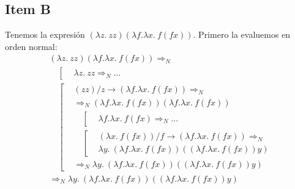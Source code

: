 \documentclass{article}
\begin{document}
\subsection*{Item B}
Tenemos la expresión $(\lambda z.\ zz)(\lambda f.\lambda x.\ f(fx))$.
Primero la evaluemos en orden normal:
\begin{equation*}
  \begin{aligned}
    &(\lambda z.\ zz)(\lambda f.\lambda x.\ f(fx)) \Rightarrow_N \\
    &\quad\left[
      \begin{aligned}
        &\lambda z.\ zz \Rightarrow_N \dots
      \end{aligned}
    \right. \\ 
    &\quad\left[
      \begin{aligned}
        &(zz) / z \to (\lambda f.\lambda x.\ f(fx)) \Rightarrow_N \\ 
        &\Rightarrow_N (\lambda f.\lambda x.\ f(fx))(\lambda f.\lambda x.\ f(fx)) \\
        &\quad\left[
          \begin{aligned}
            &\lambda f.\lambda x.\ f(fx) \Rightarrow_N \dots
          \end{aligned}
        \right. \\ 
        &\quad\left[
          \begin{aligned}
            &(\lambda x.\ f(fx)) / f \to (\lambda f.\lambda x.\ f(fx)) \Rightarrow_N \\ 
            &\lambda y.\ (\lambda f.\lambda x.\ f(fx))((\lambda f.\lambda x.\ f(fx))y)
          \end{aligned}
        \right. \\ 
        &\Rightarrow_N \lambda y.\ (\lambda f.\lambda x.\ f(fx))((\lambda f.\lambda x.\ f(fx))y)
      \end{aligned}
    \right. \\ 
    &\Rightarrow_N \lambda y.\ (\lambda f.\lambda x.\ f(fx))((\lambda f.\lambda x.\ f(fx))y)
  \end{aligned}
\end{equation*}
\end{document}
